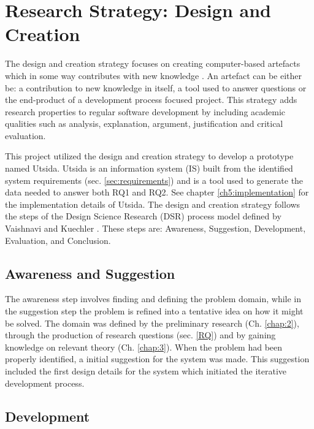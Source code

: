 \section{Research Strategy: Design and Creation}

The design and creation strategy focuses on creating computer-based artefacts which in some way contributes with new knowledge \cite{oates2005researching}. An artefact can be either be: a contribution to new knowledge in itself, a tool used to answer questions or the end-product of a development process focused project. This strategy adds research properties to regular software development by including academic qualities such as analysis, explanation, argument, justification and critical evaluation.

This project utilized the design and creation strategy to develop a prototype named Utsida. Utsida is an information system (IS) built from the identified system requirements (sec. \ref{sec:requirements}) and is a tool used to generate the data needed to answer both RQ1 and RQ2. See chapter \ref{ch5:implementation} for the implementation details of Utsida. The design and creation strategy follows the steps of the Design Science Research (DSR) process model defined by Vaishnavi and Kuechler \cite{vaishnavi2004design}. These steps are: Awareness, Suggestion, Development, Evaluation, and Conclusion.

\subsection{Awareness and Suggestion}
The awareness step involves finding and defining the problem domain, while in the suggestion step the problem is refined into a tentative idea on how it might be solved. The domain was defined by the preliminary research (Ch. \ref{chap:2}), through the production of research questions (sec. \ref{RQ}) and by gaining knowledge on relevant theory (Ch. \ref{chap:3}). When the problem had been properly identified, a initial suggestion for the system was made. This suggestion included the first design details for the system which initiated the iterative development process.

\subsection{Development}

